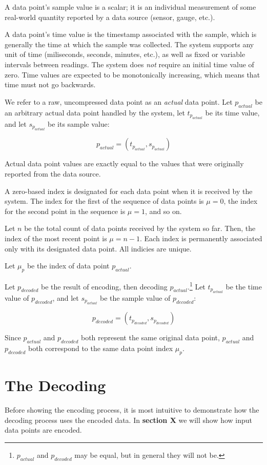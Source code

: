 \documentclass{article}
\begin{document}
A data point's sample value is a scalar; it is an individual measurement of some real-world quantity reported by a data source (sensor, gauge, etc.).

A data point's time value is the timestamp associated with the sample, which is generally the time at which the sample was collected. The system supports any unit of time (miliseconds, seconds, minutes, etc.), as well as fixed or variable intervals between readings. The system does \textit{not} require an initial time value of zero. Time values are expected to be monotonically increasing, which means that time must not go backwards.

We refer to a raw, uncompressed data point as an \textit{actual} data point.
Let \(p_{actual}\) be an arbitrary actual data point handled by the system, let \(t_{p_{actual}}\) be its time value, and let \(s_{p_{actual}}\) be its sample value:

\[ p_{actual} = (t_{p_{actual}}, s_{p_{actual}}) \]

Actual data point values are exactly equal to the values that were originally reported from the data source.

A zero-based index is designated for each data point when it is received by the system. The index for the first of the sequence of data points is \(\mu = 0\), the index for the second point in the sequence is \(\mu = 1\), and so on.

Let \(n\) be the total count of data points received by the system so far. Then, the index of the most recent point is \(\mu = n-1\). Each index is permanently associated only with its designated data point. All indicies are unique.

Let \(\mu_p\) be the index of data point \(p_{actual}\).

Let \(p_{decoded}\) be the result of encoding, then decoding \(p_{actual}\).\footnote{\(p_{actual}\) and \(p_{decoded}\) may be equal, but in general they will not be.}
Let \(t_{p_{actual}}\) be the time value of \(p_{decoded}\), and let \(s_{p_{actual}}\) be the sample value of \(p_{decoded}\):

\[ p_{decoded} = (t_{p_{decoded}}, s_{p_{decoded}}) \]

Since \(p_{actual}\) and \(p_{decoded}\) both represent the same original data point, \(p_{actual}\) and \(p_{decoded}\) both correspond to the same data point index \(\mu_p\).

\section{The Decoding}
Before showing the encoding process, it is most intuitive to demonstrate how the decoding process uses the encoded data. In \textbf{section X} we will show how input data points are encoded.
\end{document}
